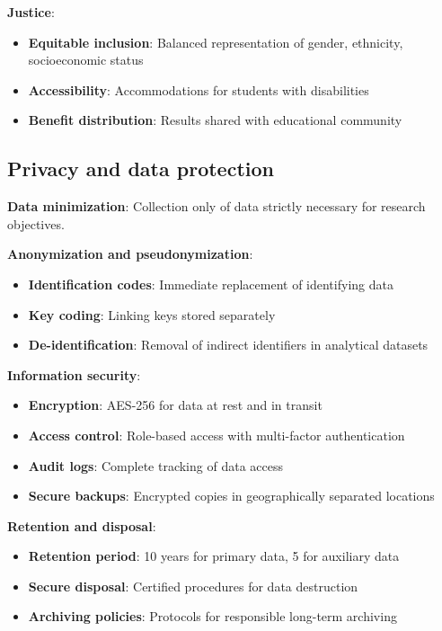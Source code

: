 \textbf{Justice}:
\begin{itemize}
    \item \textbf{Equitable inclusion}: Balanced representation of gender, ethnicity, socioeconomic status
    \item \textbf{Accessibility}: Accommodations for students with disabilities
    \item \textbf{Benefit distribution}: Results shared with educational community
\end{itemize}

\subsection{Privacy and data protection}

\textbf{Data minimization}: Collection only of data strictly necessary for research objectives.

\textbf{Anonymization and pseudonymization}:
\begin{itemize}
    \item \textbf{Identification codes}: Immediate replacement of identifying data
    \item \textbf{Key coding}: Linking keys stored separately
    \item \textbf{De-identification}: Removal of indirect identifiers in analytical datasets
\end{itemize}

\textbf{Information security}:
\begin{itemize}
    \item \textbf{Encryption}: AES-256 for data at rest and in transit
    \item \textbf{Access control}: Role-based access with multi-factor authentication
    \item \textbf{Audit logs}: Complete tracking of data access
    \item \textbf{Secure backups}: Encrypted copies in geographically separated locations
\end{itemize}

\textbf{Retention and disposal}:
\begin{itemize}
    \item \textbf{Retention period}: 10 years for primary data, 5 for auxiliary data
    \item \textbf{Secure disposal}: Certified procedures for data destruction
    \item \textbf{Archiving policies}: Protocols for responsible long-term archiving
\end{itemize}

